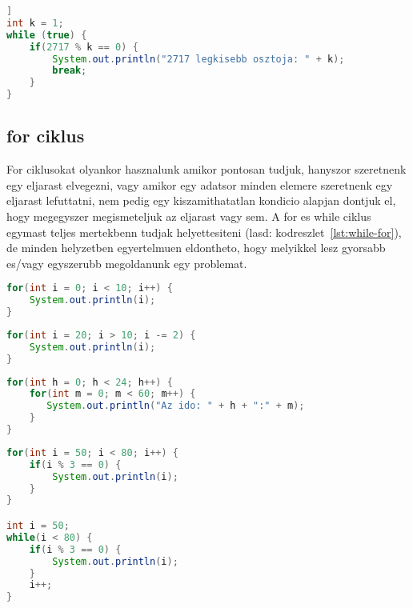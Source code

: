 \documentclass{article}
\begin{document}
\begin{lstlisting}[language=Java, caption=Pelda while ciklus 2: 2717 legkisebb osztojanak megkeresese]]
int k = 1;
while (true) {
    if(2717 % k == 0) {
        System.out.println("2717 legkisebb osztoja: " + k);
        break;
    }
}
\end{lstlisting}

\newpage

\subsection{for ciklus}

For ciklusokat olyankor hasznalunk amikor pontosan tudjuk, hanyszor szeretnenk egy eljarast elvegezni, vagy amikor egy adatsor minden elemere szeretnenk egy eljarast lefuttatni, nem pedig egy kiszamithatatlan kondicio alapjan dontjuk el, hogy megegyszer megismeteljuk az eljarast vagy sem. A for es while ciklus egymast teljes mertekbenn tudjak helyettesiteni (lasd: kodreszlet~\ref{lst:while-for}), de minden helyzetben egyertelmuen eldontheto, hogy melyikkel lesz gyorsabb es/vagy egyszerubb megoldanunk egy problemat.

\begin{lstlisting}[language=Java, caption=Pelda for ciklus 1: Szamok kiirasa 0-tol 10-ig]
for(int i = 0; i < 10; i++) {
    System.out.println(i);
}
\end{lstlisting}

\begin{lstlisting}[language=Java, caption=Pelda for ciklus 2: Minden masodik szam kiirasa 20-tol 10-ig]
for(int i = 20; i > 10; i -= 2) {
    System.out.println(i);
}
\end{lstlisting}

\begin{lstlisting}[language=Java, caption=Pelda for ciklus 3: Ido kiirasa precenkent ejfeltol ejfelig]
for(int h = 0; h < 24; h++) {
    for(int m = 0; m < 60; m++) {
       System.out.println("Az ido: " + h + ":" + m);
    }
}
\end{lstlisting}

\begin{lstlisting}[language=Java,label={lst:while-for}, caption=Pelda for ciklus 4: 50 es 80 kozotti 3-al oszthato szamok kiirasa konzolra while es for ciklussal]
for(int i = 50; i < 80; i++) {
    if(i % 3 == 0) {
        System.out.println(i);
    }
}

int i = 50;
while(i < 80) {
    if(i % 3 == 0) {
        System.out.println(i);
    }
    i++;
}
\end{lstlisting}
\end{document}
